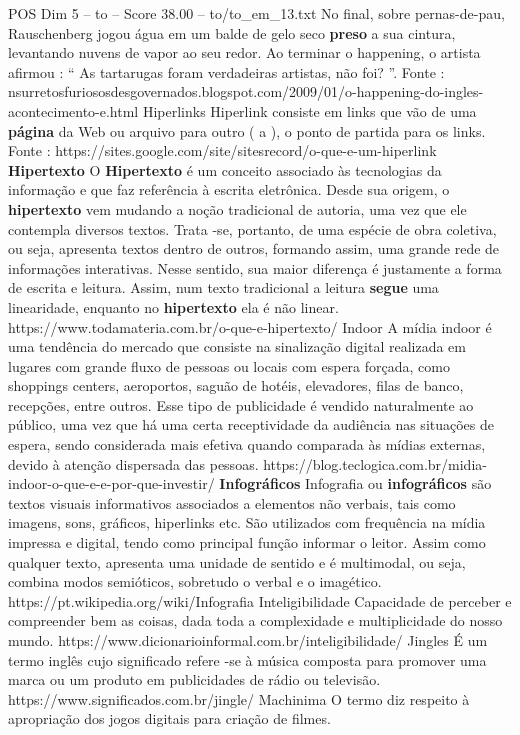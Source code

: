 \begin{textsample}{POS Dim 5 – to – Score 38.00 – to/to\_em\_13.txt}
No final, sobre pernas-de-pau, Rauschenberg jogou água em um balde de gelo seco \textbf{preso} a sua cintura, levantando nuvens de vapor ao seu redor.
Ao terminar o happening, o artista afirmou : “ As tartarugas foram verdadeiras artistas, não foi? ”.
Fonte : nsurretosfuriososdesgovernados.blogspot.com/2009/01/o-happening-do-ingles-acontecimento-e.html Hiperlinks Hiperlink consiste em links que vão de uma \textbf{página} da Web ou arquivo para outro ( a ), o ponto de partida para os links.
Fonte : https://sites.google.com/site/sitesrecord/o-que-e-um-hiperlink \textbf{Hipertexto} O \textbf{Hipertexto} é um conceito associado às tecnologias da informação e que faz referência à escrita eletrônica.
Desde sua origem, o \textbf{hipertexto} vem mudando a noção tradicional de autoria, uma vez que ele contempla diversos textos.
Trata -se, portanto, de uma espécie de obra coletiva, ou seja, apresenta textos dentro de outros, formando assim, uma grande rede de informações interativas.
Nesse sentido, sua maior diferença é justamente a forma de escrita e leitura.
Assim, num texto tradicional a leitura \textbf{segue} uma linearidade, enquanto no \textbf{hipertexto} ela é não linear. https://www.todamateria.com.br/o-que-e-hipertexto/ Indoor A mídia indoor é uma tendência do mercado que consiste na sinalização digital realizada em lugares com grande fluxo de pessoas ou locais com espera forçada, como shoppings centers, aeroportos, saguão de hotéis, elevadores, filas de banco, recepções, entre outros.
Esse tipo de publicidade é vendido naturalmente ao público, uma vez que há uma certa receptividade da audiência nas situações de espera, sendo considerada mais efetiva quando comparada às mídias externas, devido à atenção dispersada das pessoas. https://blog.teclogica.com.br/midia-indoor-o-que-e-e-por-que-investir/ \textbf{Infográficos} Infografia ou \textbf{infográficos} são textos visuais informativos associados a elementos não verbais, tais como imagens, sons, gráficos, hiperlinks etc.
São utilizados com frequência na mídia impressa e digital, tendo como principal função informar o leitor.
Assim como qualquer texto, apresenta uma unidade de sentido e é multimodal, ou seja, combina modos semióticos, sobretudo o verbal e o imagético. https://pt.wikipedia.org/wiki/Infografia Inteligibilidade Capacidade de perceber e compreender bem as coisas, dada toda a complexidade e multiplicidade do nosso mundo. https://www.dicionarioinformal.com.br/inteligibilidade/ Jingles É um termo inglês cujo significado refere -se à música composta para promover uma marca ou um produto em publicidades de rádio ou televisão. https://www.significados.com.br/jingle/ Machinima O termo diz respeito à apropriação dos jogos digitais para criação de filmes.

\end{textsample}
